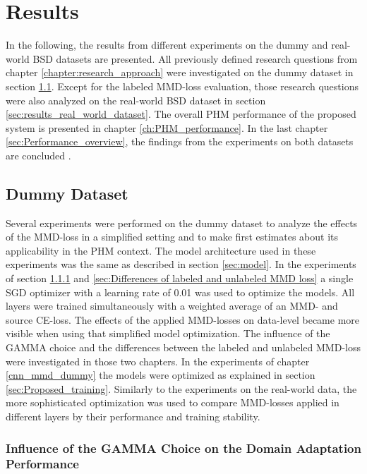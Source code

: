 \chapter{Results}\label{sec:results}

In the following, the results from different experiments on the dummy and real-world BSD datasets are presented. All previously defined research questions from chapter \ref{chapter:research_approach} were investigated on the dummy dataset in section \ref{sec:results_dummy_dataset}. Except for the labeled MMD-loss evaluation, those research questions were also analyzed on the real-world BSD dataset in section \ref{sec:results_real_world_dataset}. The overall PHM performance of the proposed system is presented in chapter \ref{ch:PHM_performance}. In the last chapter \ref{sec:Performance_overview}, the findings from the experiments on both datasets are concluded .




\section{Dummy Dataset}\label{sec:results_dummy_dataset}
Several experiments were performed on the dummy dataset to analyze the effects of the MMD-loss in a simplified setting and to make first estimates about its applicability in the PHM context. The model architecture used in these experiments was the same as described in section \ref{sec:model}. In the experiments of section \ref{sec:Balancing Cross-Entropy and MMD loss} and \ref{sec:Differences of labeled and unlabeled MMD loss} a single SGD optimizer with a learning rate of 0.01 was used to optimize the models. All layers were trained simultaneously with a weighted average of an MMD- and source CE-loss. The effects of the applied MMD-losses on data-level became more visible when using that simplified model optimization. The influence of the GAMMA choice and the differences between the labeled and unlabeled MMD-loss were investigated in those two chapters. In the experiments of chapter \ref{cnn_mmd_dummy} the models were optimized as explained in section \ref{sec:Proposed_training}. Similarly to the experiments on the real-world data, the more sophisticated optimization was used to compare MMD-losses applied in different layers by their performance and training stability.

\subsection{Influence of the GAMMA Choice on the Domain Adaptation Performance} \label{sec:Balancing Cross-Entropy and MMD loss}

